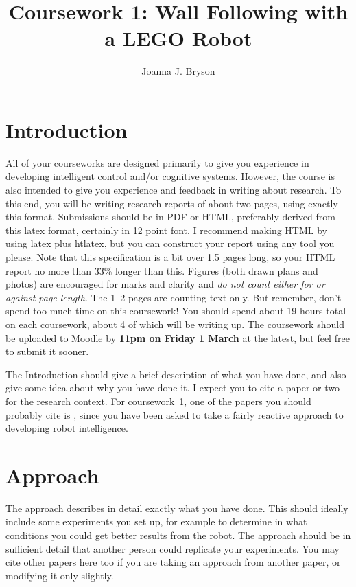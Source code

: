 \documentclass[a4paper,12pt]{article}
\title{Coursework 1:  Wall Following with a LEGO Robot}
\author{Joanna J. Bryson}
\begin{document}
\maketitle

\section{Introduction}
All of your courseworks are designed primarily to give you experience
in developing intelligent control and/or cognitive systems.  However,
the course is also intended to give you experience and feedback in
writing about research.  To this end, you will be writing research
reports of about two pages, using exactly this format.  Submissions
should be in PDF or HTML, preferably derived from this latex format,
certainly in 12 point font.  I recommend making HTML by using latex
plus htlatex, but you can construct your report using any tool you
please.  Note that this specification is a bit over 1.5 pages long, so
your HTML report no more than 33\% longer than this.  Figures (both
drawn plans and photos) are encouraged for marks and clarity and {\em
  do not count either for or against page length}.  The 1--2 pages are
counting text only.  But remember, don't spend too much time on this
coursework!  You should spend about 19 hours total on each coursework,
about 4 of which will be writing up. The coursework should be uploaded
to Moodle by {\bf 11pm on Friday 1 March} at the latest, but feel free to
submit it sooner.

The Introduction should give a brief description of  what you have
done, and also give some idea about why you have done it.  I expect
you to cite a paper or two for the research context.  For
coursework~1, one of the papers you should probably cite is
\citet{BrooksAIJ91}, since you have been asked to take a fairly
reactive approach to developing robot intelligence. 

\section{Approach}

The approach describes in detail exactly what you have done.  This
should ideally include some experiments you set up, for example to
determine in what conditions you could get better results from the
robot.  The approach should be in  sufficient detail that another
person could replicate your experiments.  You may cite other papers
here too if you are taking an approach from another paper, or
modifying it only slightly.
\end{document}

